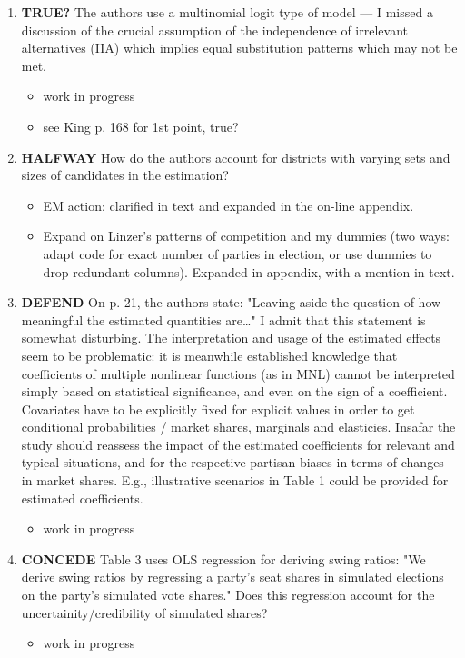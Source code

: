 \documentclass{article}
\begin{document}
\begin{enumerate}
\item {\bfseries\sffamily TRUE?} The authors use a multinomial logit type of model --- I missed a discussion of the crucial assumption of the independence of irrelevant alternatives (IIA) which implies equal substitution patterns which may not be met.
\label{sec:orgheadline27}
\begin{itemize}
\item work in progress
\item see King p. 168 for 1st point, true?
\end{itemize}
\item {\bfseries\sffamily HALFWAY} How do the authors account for districts with varying sets and sizes of candidates in the estimation?
\label{sec:orgheadline28}
\begin{itemize}
\item EM action: clarified in text and expanded in the on-line appendix.
\item Expand on Linzer's patterns of competition and my dummies (two ways: adapt code for exact number of parties in election, or use dummies to drop redundant columns). Expanded in appendix, with a mention in text.
\end{itemize}
\item {\bfseries\sffamily DEFEND} On p. 21, the authors state: "Leaving aside the question of how meaningful the estimated quantities are\ldots{}"  I admit that this statement is somewhat disturbing. The interpretation and usage of the estimated effects seem to be problematic: it is meanwhile established knowledge that coefficients of multiple nonlinear functions (as in MNL)  cannot be interpreted simply based on statistical significance, and even on the sign of a coefficient. Covariates have to be explicitly fixed for explicit values in order to get conditional probabilities / market shares, marginals and elasticies. Insafar the study should reassess the impact of the estimated coefficients for relevant and typical situations, and for the respective partisan biases in terms of  changes in market shares. E.g., illustrative scenarios in Table 1 could be provided for estimated coefficients.
\label{sec:orgheadline29}
\begin{itemize}
\item work in progress
\end{itemize}

\item {\bfseries\sffamily CONCEDE} Table 3 uses OLS regression for deriving swing ratios: "We derive swing ratios by regressing a party's seat shares in simulated elections on the party's simulated vote shares." Does this regression account for the uncertainity/credibility of simulated shares?
\label{sec:orgheadline30}
\begin{itemize}
\item work in progress
\end{itemize}
\end{enumerate}
\end{document}
